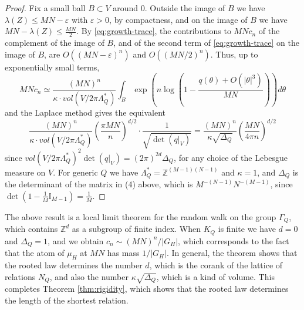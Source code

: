 \documentclass[11pt,reqno]{amsart}
\theoremstyle{definition}
\numberwithin{equation}{section}
\begin{document}
\begin{proof}
Fix a small ball $B\subset V$ around 0. Outside the image of $B$ we have $\lambda(Z)\leq MN-\varepsilon$ with $\varepsilon>0$, by compactness, and on the image of $B$ we have $MN-\lambda(Z)\leq\frac{MN}2$. By \eqref{eq:growth-trace}, the contributions to $MNc_n$ of the complement of the image of $B$, and of the second term of \eqref{eq:growth-trace} on the image of $B$, are $O((MN-\varepsilon)^n)$ and $O((MN/2)^n)$. Thus, up to exponentially small terms,
$$MNc_n\simeq\frac{(MN)^n}{\kappa\cdot vol(V/2\pi\Lambda_Q^*)}\int_B\exp\left(n\log\left(1-\frac{q(\theta)+O(|\theta|^3)}{MN}\right)\right)d\theta$$
and the Laplace method gives the equivalent
$$\frac{(MN)^n}{\kappa\cdot vol(V/2\pi\Lambda_Q^*)}\left(\frac{\pi MN}n\right)^{d/2}\cdot\frac1{\sqrt{\det(q|_V)}}=\frac{(MN)^n}{\kappa\sqrt{\Delta_Q}}\left(\frac{MN}{4\pi n}\right)^{d/2}$$
since $vol(V/2\pi\Lambda_Q^*)^2\det(q|_V)=(2\pi)^{2d}\Delta_Q$, for any choice of the Lebesgue measure on $V$. For generic $Q$ we have $\Lambda_Q^*=\mathbb Z^{(M-1)(N-1)}$ and $\kappa=1$, and $\Delta_Q$ is the determinant of the matrix in (4) above, which is $M^{-(N-1)}N^{-(M-1)}$, since $\det(1-\frac1M\mathbb I_{M-1})=\frac1M$.
\end{proof}

The above result is a local limit theorem for the random walk on the group $\Gamma_Q$, which contains $\mathbb Z^d$ as a subgroup of finite index. When $K_Q$ is finite we have $d=0$ and $\Delta_Q=1$, and we obtain $c_n\sim(MN)^n/|G_H|$, which corresponds to the fact that the atom of $\mu_H$ at $MN$ has mass $1/|G_H|$. In general, the theorem shows that the rooted law determines the number $d$, which is the corank of the lattice of relations $N_Q$, and also the number $\kappa\sqrt{\Delta_Q}$, which is a kind of volume. This completes Theorem \ref{thm:rigidity}, which shows that the rooted law determines the length of the shortest relation.
\end{document}
